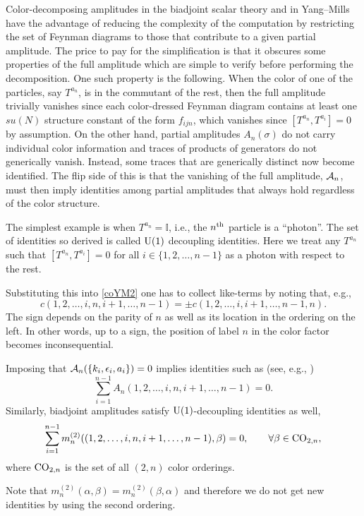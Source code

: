 \documentclass[pdftex]{sigma}
\theoremstyle{definition}
\def \be {\begin{equation}}
\def \ee {\end{equation}}
\def \be {\begin{equation}}
\numberwithin{equation}{section}
\begin{document}
Color-decomposing amplitudes in the biadjoint scalar theory and in Yang--Mills have the advantage of reducing the complexity of the computation by restricting the set of Feynman diagrams to those that contribute to a given partial amplitude. The price to pay for the simplification is that it obscures some properties of the full amplitude which are simple to verify before performing the decomposition. One such property is the following. When the color of one of the particles, say $T^{a_n}$, is in the commutant of the rest, then the full amplitude trivially vanishes since each color-dressed Feynman diagram contains at least one $su(N)$ structure constant of the form $f_{ijn}$, which vanishes since $[T^{a_n},T^{a_i}]=0$ by assumption. On the other hand, partial amplitudes $A_n(\sigma )$ do not carry individual color information and traces of products of generators do not generically vanish. Instead, some traces that are generically distinct now become identified. The flip side of this is that the vanishing of the full amplitude, ${\cal A}_n$, must then imply identities among partial amplitudes that always hold regardless of the color structure.

The simplest example is when $T^{a_n}=\mathbb{I}$, i.e., the $n^{\rm th}$ particle is a ``photon''. The set of identities so derived is called ${\rm U}(1)$ decoupling identities. Here we treat any $T^{a_n}$ such that $[T^{a_n}, T^{a_i}]=0$ for all $i\in \{ 1,2,\dots ,n-1\}$ as a photon with respect to the rest.

Substituting this into \eqref{coYM2} one has to collect like-terms by noting that, e.g.,
\be\label{k2Prop}
c(1,2,\dots ,i,n,i+1,\dots ,{n-1}) = \pm c(1,2,\dots ,i,i+1,\dots,{n-1},n).
\ee
The sign depends on the parity of $n$ as well as its location in the ordering on the left. In other words, up to a sign, the position of label $n$ in the color factor becomes inconsequential.

Imposing that ${\cal A}_n(\{k_i,\epsilon_i,a_i\})=0$ implies identities such as (see, e.g., \cite{Mangano:1990by})
\be\label{stdU1}
\sum_{i=1}^{n-1} A_n(1,2,\dots ,i,n,i+1,\dots, n-1) = 0.
\ee
Similarly, biadjoint amplitudes satisfy ${\rm U}(1)$-decoupling identities as well,
\[
\sum_{i=1}^{n-1} m_n^{(2)}((1,2,\dots ,i,n,i+1,\dots, n-1),\beta) = 0, \qquad \forall \beta\in {\rm CO}_{2,n},
\]
where ${\rm CO}_{2,n}$ is the set of all $(2,n)$ color orderings.

Note that $m_n^{(2)}(\alpha,\beta)=m_n^{(2)}(\beta,\alpha)$ and therefore we do not get new identities by using the second ordering.
\end{document}
